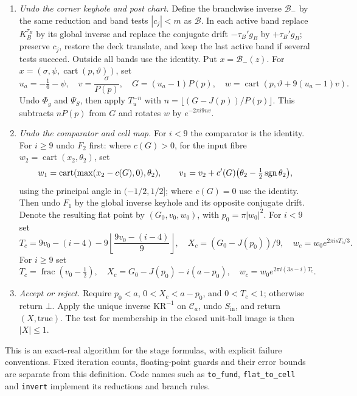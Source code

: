 \begin{enumerate}[label=\textbf{\arabic*.},leftmargin=2em]
\item \emph{Undo the corner keyhole and post chart.} Define the branchwise inverse $\mathcal B_-$ by the same
reduction and band tests $|c_j|<m$ as $\mathcal B$. In each active band replace $K_B^{\tau_B}$ by its global inverse
and replace the conjugate drift $-\tau_B'g_B$ by $+\tau_B'g_B$; preserve $c_j$, restore the deck translate, and keep
the last active band if several tests succeed. Outside all bands use the identity. Put $x=\mathcal B_-(z)$.
For $x=(\sigma,\psi,\operatorname{cart}(p,\vartheta))$, set
\[
 u_a=-\tfrac16-\psi,\quad v=\frac{\sigma}{P(p)},\quad G=(u_a-1)P(p),\quad
 w=\operatorname{cart}(p,\vartheta+9(u_a-1)v).
\]
Undo $\Phi_g$ and $\Psi_S$, then apply $T_u^{-n}$ with
$n=\lfloor(G-J(p))/P(p)\rfloor$. This subtracts $nP(p)$ from $G$ and rotates $w$ by $e^{-2\pi i9nv}$.

\item \emph{Undo the comparator and cell map.} For $i<9$ the comparator is the identity. For $i\ge9$ undo $F_2$
first: where $c(G)>0$, for the input fibre $w_2=\operatorname{cart}(x_2,\theta_2)$, set
\[
 w_1=\operatorname{cart}(\max(x_2-c(G),0),\theta_2),\qquad
 v_1=v_2+c'(G)\bigl(\theta_2-\tfrac12\operatorname{sgn}\theta_2\bigr),
\]
using the principal angle in $(-1/2,1/2]$; where $c(G)=0$ use the identity. Then undo $F_1$ by the global inverse
keyhole and its opposite conjugate drift. Denote the resulting flat point by $(G_0,v_0,w_0)$, with $p_0=\pi|w_0|^2$.
For $i<9$ set
\[
 T_c=9v_0-(i-4)-9\left\lfloor\frac{9v_0-(i-4)}9\right\rfloor,\quad
 X_c=(G_0-J(p_0))/9,\quad w_c=w_0e^{2\pi i sT_c/3}.
\]
For $i\ge9$ set
\[
 T_c=\operatorname{frac}(v_0-\tfrac12),\quad X_c=G_0-J(p_0)-i(a-p_0),\quad
 w_c=w_0e^{2\pi i(3s-i)T_c}.
\]

\item \emph{Accept or reject.} Require $p_0<a$, $0<X_c<a-p_0$, and $0<T_c<1$; otherwise return $\bot$.
Apply the unique inverse $\mathrm{KR}^{-1}$ on $\mathcal C_a$, undo $S_{\mathrm{in}}$, and return $(X,\mathrm{true})$.
The test for membership in the closed unit-ball image is then $|X|\le1$.
\end{enumerate}

This is an exact-real algorithm for the stage formulas, with explicit failure conventions. Fixed iteration counts,
floating-point guards and their error bounds are separate from this definition. Code names such as
\texttt{to\_fund}, \texttt{flat\_to\_cell} and \texttt{invert} implement its reductions and branch rules.
